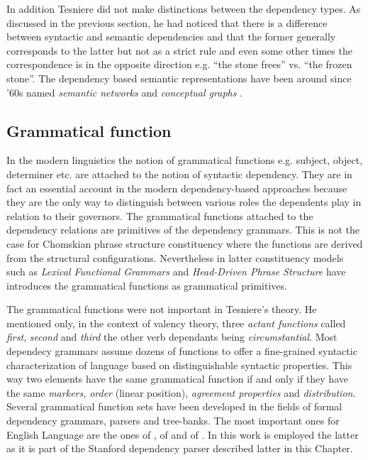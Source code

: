 In addition Tesniere did not make distinctions between the dependency types. As discussed in the previous section, he had noticed that there is a difference between syntactic and semantic dependencies and that the former generally corresponds to the latter but not as a strict rule and even some other times the correspondence is in the opposite direction e.g. ``the stone frees'' vs. ``the frozen stone''. The dependency based semantic representations have been around since '60s named \textit{semantic networks} \citep{ZolkovskijMelcuk67,melcuk88} and \textit{conceptual graphs} \citep{schank1969, Sowa1976}.

\subsection{Grammatical function} 
In the modern linguistics the notion of grammatical functions e.g. subject, object, determiner etc. are attached to the notion of syntactic dependency. They are in fact an essential account in the modern dependency-based approaches because they are the only way to distinguish between various roles the dependents play in relation to their governors. The grammatical functions attached to the dependency relations are primitives of the dependency grammars. This is not the case for Chomskian phrase structure constituency where the functions are derived from the structural configurations. Nevertheless in latter constituency models such as \textit{Lexical Functional Grammars} \citep{Brensan2000} and \textit{Head-Driven Phrase Structure} \citep{PollardSag1994} have introduces the grammatical functions as grammatical primitives.

The grammatical functions were not important in Tesniere's theory. He mentioned only, in the context of valency theory, three \textit{actant functions} called \textit{first}, \textit{second} and \textit{third} the other verb dependants being \textit{circumstantial}. Most dependecy grammars assume dozens of functions to offer a fine-grained syntactic characterization of language based on distinguishable syntactic properties. This way two elements have the same grammatical function if and only if they have the same \textit{markers,} \textit{order} (linear position), \textit{agreement properties} and \textit{distribution}. Several grammatical function sets have been developed in the fields of formal dependency grammars, parsers and tree-banks. The most important ones for English Language are the ones of \citet{MelcukPertsov86}, of \citet{Johnson2000} and of \citet{Marneffe2008, Marneffe2008a}. In this work is employed the latter as it is part of the Stanford dependency parser described latter in this Chapter. 

